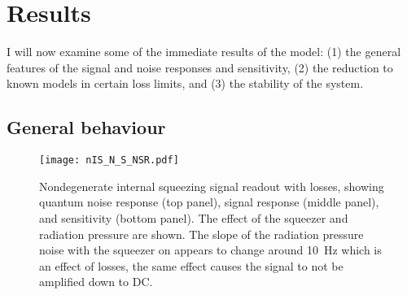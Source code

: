 \section{Results}

I will now examine some of the immediate results of the model: (1) the general features of the signal and noise responses and sensitivity, (2) the reduction to known models in certain loss limits, and (3) the stability of the system.

\subsection{General behaviour}

\begin{figure}
	\centering
	\texttt{[image: nIS\_N\_S\_NSR.pdf]}
	\caption{  Nondegenerate internal squeezing signal readout with losses, showing quantum noise response (top panel), signal response (middle panel), and sensitivity (bottom panel). The effect of the squeezer and radiation pressure are shown. The slope of the radiation pressure noise with the squeezer on appears to change around 10~Hz which is an effect of losses, the same effect causes the signal to not be amplified down to DC. }
	\label{fig:nIS_general_sens}
\end{figure}


